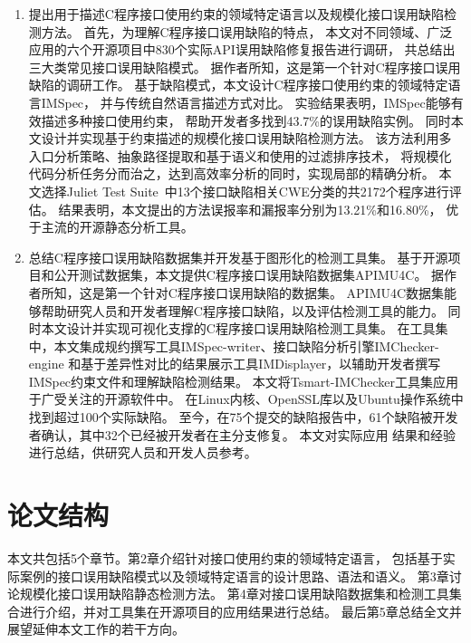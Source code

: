 \begin{enumerate}
	\item 提出用于描述C程序接口使用约束的领域特定语言以及规模化接口误用缺陷检测方法。
	首先，为理解C程序接口误用缺陷的特点，
	本文对不同领域、广泛应用的六个开源项目中830个实际API误用缺陷修复报告进行调研，
	共总结出三大类常见接口误用缺陷模式。
	据作者所知，这是第一个针对C程序接口误用缺陷的调研工作。
	基于缺陷模式，本文设计C程序接口使用约束的领域特定语言IMSpec，
	并与传统自然语言描述方式对比。
	实验结果表明，IMSpec能够有效描述多种接口使用约束，
	帮助开发者多找到43.7\%的误用缺陷实例。
	同时本文设计并实现基于约束描述的规模化接口误用缺陷检测方法。
	该方法利用多入口分析策略、抽象路径提取和基于语义和使用的过滤排序技术，
	将规模化代码分析任务分而治之，达到高效率分析的同时，实现局部的精确分析。
	本文选择Juliet Test Suite~\cite{juliet}中13个接口缺陷相关CWE分类的共2172个程序进行评估。
	结果表明，本文提出的方法误报率和漏报率分别为13.21\%和16.80\%，
	优于主流的开源静态分析工具。
	
	\item 总结C程序接口误用缺陷数据集并开发基于图形化的检测工具集。
	基于开源项目和公开测试数据集，本文提供C程序接口误用缺陷数据集APIMU4C。
	据作者所知，这是第一个针对C程序接口误用缺陷的数据集。
	APIMU4C数据集能够帮助研究人员和开发者理解C程序接口缺陷，以及评估检测工具的能力。
	同时本文设计并实现可视化支撑的C程序接口误用缺陷检测工具集。
	在工具集中，本文集成规约撰写工具IMSpec-writer、接口缺陷分析引擎IMChecker-engine
	和基于差异性对比的结果展示工具IMDisplayer，以辅助开发者撰写IMSpec约束文件和理解缺陷检测结果。
	本文将Tsmart-IMChecker工具集应用于广受关注的开源软件中。
	在Linux内核、OpenSSL库以及Ubuntu操作系统中找到超过100个实际缺陷。
	至今，在75个提交的缺陷报告中，61个缺陷被开发者确认，其中32个已经被开发者在主分支修复。
	本文对实际应用 结果和经验进行总结，供研究人员和开发人员参考。
	
	
	
\end{enumerate}
\section{论文结构}
本文共包括5个章节。第2章介绍针对接口使用约束的领域特定语言，
包括基于实际案例的接口误用缺陷模式以及领域特定语言的设计思路、语法和语义。
第3章讨论规模化接口误用缺陷静态检测方法。
第4章对接口误用缺陷数据集和检测工具集合进行介绍，并对工具集在开源项目的应用结果进行总结。
最后第5章总结全文并展望延伸本文工作的若干方向。
